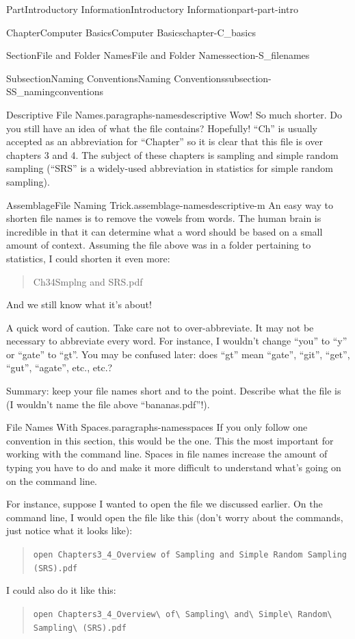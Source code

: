 \documentclass[oneside,10pt,]{book}
\newcommand{\mono}[1]{\texttt{#1}}
\begin{document}
\begin{partptx}{Part}{Introductory Information}{}{Introductory Information}{}{}{part-part-intro}
\begin{chapterptx}{Chapter}{Computer Basics}{}{Computer Basics}{}{}{chapter-C_basics}
\begin{sectionptx}{Section}{File and Folder Names}{}{File and Folder Names}{}{}{section-S_filenames}
\begin{subsectionptx}{Subsection}{Naming Conventions}{}{Naming Conventions}{}{}{subsection-SS_namingconventions}
\begin{paragraphs}{Descriptive File Names.}{paragraphs-namesdescriptive}
Wow! So much shorter. Do you still have an idea of what the file contains? Hopefully! ``Ch'' is usually accepted as an abbreviation for ``Chapter'' so it is clear that this file is over chapters 3 and 4. The subject of these chapters is sampling and simple random sampling (``SRS'' is a widely-used abbreviation in statistics for simple random sampling).%
\begin{assemblage}{Assemblage}{File Naming Trick.}{assemblage-namesdescriptive-m}%
An easy way to shorten file names is to remove the vowels from words. The human brain is incredible in that it can determine what a word should be based on a small amount of context. Assuming the file above was in a folder pertaining to statistics, I could shorten it even more:%
\begin{quote}%
Ch3\textunderscore{}4\textunderscore{}Smplng and SRS.pdf%
\end{quote}
And we still know what it's about!%
\par
A quick word of caution. Take care not to over-abbreviate. It may not be necessary to abbreviate every word. For instance, I wouldn't change ``you'' to ``y'' or ``gate'' to ``gt''. You may be confused later: does ``gt'' mean ``gate'', ``git'', ``get'', ``gut'', ``agate'', etc., etc.?%
\end{assemblage}
Summary: keep your file names short and to the point. Describe what the file is (I wouldn't name the file above ``bananas.pdf''!).%
\end{paragraphs}%
\begin{paragraphs}{File Names With Spaces.}{paragraphs-namesspaces}%
%
If you only follow one convention in this section, this would be the one. This the most important for working with the command line. Spaces in file names increase the amount of typing you have to do and make it more difficult to understand what's going on on the command line.%
\par
For instance, suppose I wanted to open the file we discussed earlier. On the command line, I would open the file like this (don't worry about the commands, just notice what it looks like):%
\begin{quote}%
\mono{open \textquotesingle{}Chapters3\_4\_Overview of Sampling and Simple Random Sampling (SRS).pdf\textquotesingle{}}%
\end{quote}
I could also do it like this:%
\begin{quote}%
\mono{open Chapters3\_4\_Overview\textbackslash{} of\textbackslash{} Sampling\textbackslash{} and\textbackslash{} Simple\textbackslash{} Random\textbackslash{} Sampling\textbackslash{} (SRS).pdf}%

\end{quote}
\end{paragraphs}
\end{subsectionptx}
\end{sectionptx}
\end{chapterptx}
\end{partptx}
\end{document}
